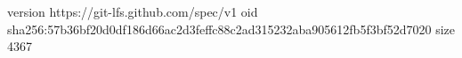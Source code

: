 version https://git-lfs.github.com/spec/v1
oid sha256:57b36bf20d0df186d66ac2d3feffc88c2ad315232aba905612fb5f3bf52d7020
size 4367
